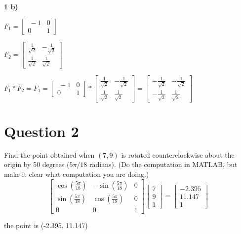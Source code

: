 \documentclass{article}
\begin{document}
\item \textbf{1 b) }
\begin{center}
\item $F_1 = \begin{bmatrix}\ -1 & 0 \\ 0 & 1\end{bmatrix}$
\item $F_2 = \begin{bmatrix}\frac{1}{\sqrt2} & -\frac{1}{\sqrt2}\\ \frac{1}{\sqrt2} &\frac{1}{\sqrt2}\end{bmatrix}$
\item $F_1 * F_2 = F_1 = \begin{bmatrix}\ -1 & 0 \\ 0 & 1\end{bmatrix} * \begin{bmatrix}\frac{1}{\sqrt2} & -\frac{1}{\sqrt2}\\ \frac{1}{\sqrt2} &\frac{1}{\sqrt2}\end{bmatrix} = \begin{bmatrix}-\frac{1}{\sqrt2} & -\frac{1}{\sqrt2}\\ -\frac{1}{\sqrt2} & \frac{1}{\sqrt2}\end{bmatrix}$
\item 
\end{center}

\section{Question 2}
\item Find the point obtained when $(7, 9)$ is rotated counterclockwise about the origin by 50 degrees ($5\pi/18$ radians).  (Do the computation in MATLAB, but make it clear what computation you are doing.)
\begin{equation}
\left[\begin{array}{ccc}
\cos \left(\frac{5 \pi}{18}\right) & -\sin \left(\frac{5 \pi}{18}\right) & 0 \\
\sin \left(\frac{5 \pi}{18}\right) & \cos \left(\frac{5 \pi}{18}\right) & 0 \\
0 & 0 & 1
\end{array}\right]\left[\begin{array}{c}
7 \\
9 \\
1
\end{array}\right]=\left[\begin{array}{c}
-2.395\\11.147 \\ 1
\end{array}\right]
\end{equation}
\begin{center}
    

\item the point is (-2.395, 11.147)
\end{center}
\end{document}
